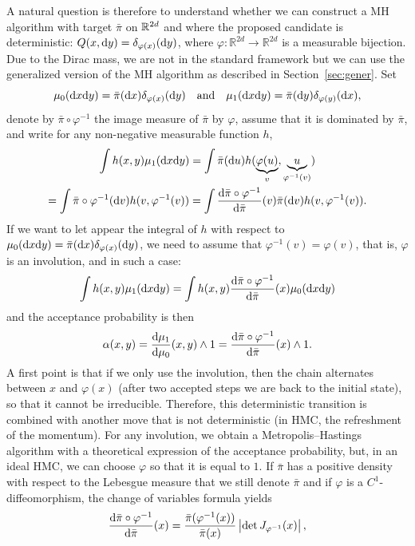 \documentclass[english,graybox,envcountchap,envcountsame,sectrefs,shortlabels]{svmono}
\theoremstyle{style}
\newcommand{\lrav}[1]{\left|#1 \right|}
\newcommand{\eqsp}{}
\begin{document}
A natural question is therefore to understand whether we can construct a MH algorithm with target $\bar{\pi}$ on $\mathbb{R}^{2d}$ and where the proposed candidate is deterministic: $Q(x,\mathrm{d} y)=\delta_{\varphi(x)}(\mathrm{d} y)$, where $\varphi: \mathbb{R}^{2d} \to \mathbb{R}^{2d}$ is a measurable bijection. Due to the Dirac mass, we are not in the standard framework but we can use the generalized version of the MH algorithm as described in Section~\ref{sec:gener}. Set
$$
\mu_0(\rmd x\rmd y)=\bar{\pi}(\rmd x)\delta_{\varphi(x)}(\rmd y) \quad \mbox{and}\quad \mu_1(\rmd x\rmd y)=\bar{\pi}(\rmd y)\delta_{\varphi(y)}(\rmd x)\eqsp,
$$
denote by $\bar\pi\circ\varphi^{-1}$ the image measure of $\bar\pi$ by $\varphi$, assume that it is dominated by $\bar\pi$, and write for any non-negative measurable function $h$,
\begin{multline*}
\int h(x,y) \mu_1(\rmd x \rmd y)= \int \bar{\pi}(\rmd u) h(\underbrace{\varphi(u)}_{v},\underbrace{u}_{\varphi^{-1}(v)})\\
=\int \bar{\pi}\circ \varphi^{-1} (\rmd v) h (v,\varphi^{-1}(v))= \int \frac{\rmd \bar{\pi}\circ \varphi^{-1}}{\rmd \bar{\pi}}(v) \bar{\pi}(\rmd v) h (v,\varphi^{-1}(v))\eqsp.
\end{multline*}
If we want to let appear the integral of $h$ with respect to $\mu_0(\mathrm{d} x\mathrm{d} y)=\bar{\pi}(\mathrm{d} x)\delta_{\varphi(x)}(\mathrm{d} y)$, we need to assume that $\varphi^{-1}(v)=\varphi(v)$, that is, $\varphi$ is an involution, and in such a case:
$$
\int h(x,y) \mu_1(\mathrm{d} x \mathrm{d} y)=\int h(x,y) \frac{\mathrm{d} \bar{\pi}\circ \varphi^{-1}}{\mathrm{d} \bar{\pi}}(x) \mu_0(\mathrm{d} x\mathrm{d} y)
$$
and the acceptance probability is then
$$
\alpha(x,y)=\frac{\rmd \mu_1}{\rmd \mu_0}(x,y) \wedge 1=\frac{\rmd \bar{\pi}\circ \varphi^{-1}}{\rmd \bar{\pi}}(x) \wedge 1\eqsp.
$$
A first point is that if we only use the involution, then the chain alternates between $x$ and $\varphi(x)$ (after two accepted steps we are back to the initial state), so that it cannot be irreducible. Therefore, this deterministic transition is combined with another move that is not deterministic (in HMC, the refreshment of the momentum).
For any involution, we obtain a Metropolis--Hastings algorithm with a theoretical expression of the acceptance probability, but, in an ideal HMC, we can choose $\varphi$ so that it is equal to $1$. If $\bar{\pi}$ has a positive density with respect to the Lebesgue measure that we still denote $\bar{\pi}$ and if $\varphi$ is a $C^1$-diffeomorphism, the change of variables formula yields
$$
\frac{\rmd \bar{\pi}\circ \varphi^{-1}}{\rmd \bar{\pi}}(x)=\frac{\bar{\pi}(\varphi^{-1}(x))}{\bar{\pi}(x)} \lrav{\det J_{\varphi^{-1}}(x)}\eqsp,
$$
\end{document}
